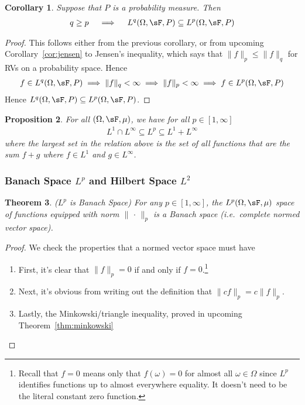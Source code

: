 \documentclass[12pt]{article}
\theoremstyle{plain}
\newtheorem{thm}{Theorem}[section]
\newtheorem{prop}[thm]{Proposition}
\newtheorem{cor}[thm]{Corollary}
\theoremstyle{definition}
\theoremstyle{remark}
\begin{document}
\begin{cor}
Suppose that $P$ is a probability measure. Then
\begin{align*}
  q \geq p
  \quad\implies\quad
  L^q(\Omega,\sF,P)
  \subseteq
  L^p(\Omega,\sF,P)
\end{align*}
\end{cor}
\begin{proof}
This follows either from the previous corollary, or from upcoming
Corollary~\ref{cor:jensen} to Jensen's inequality, which says that
$\lVert f\rVert_p\leq \lVert f\rVert_q$
for RVs on a probability space.
Hence
\begin{align*}
  f\in L^q(\Omega,\sF,P)
  \implies
  \lVert f\rVert_q
  < \infty
  \implies
  \lVert f\rVert_p
  < \infty
  \implies
  f\in L^p(\Omega,\sF,P)
\end{align*}
Hence $L^q(\Omega,\sF,P)\subseteq L^p(\Omega,\sF,P)$.
\end{proof}

\begin{prop}
For all $(\Omega,\sF,\mu)$, we have for all $p\in[1,\infty]$
\begin{align*}
  L^1 \cap L^\infty \subseteq L^p \subseteq L^1+L^\infty
\end{align*}
where the largest set in the relation above is the set of all functions
that are the sum $f+g$ where $f\in L^1$ and $g\in L^\infty$.
\end{prop}


\clearpage
\subsubsection{Banach Space $L^p$ and Hilbert Space $L^2$}

\begin{thm}\emph{($L^p$ is Banach Space)}
For any $p\in[1,\infty]$, the $L^p(\Omega,\sF,\mu)$ space of functions
equipped with norm $\lVert\,\cdot\,\rVert_p$ is a Banach space (i.e.\
complete normed vector space).
\end{thm}
\begin{proof}
We check the properties that a normed vector space must have
\begin{enumerate}
  \item First, it's clear that $\lVert f\rVert_p=0$ if and only if
    $f=0$.\footnote{%
      Recall that $f=0$ means only that $f(\omega)=0$ for almost all
      $\omega\in\Omega$ since $L^p$ identifies functions up to almost
      everywhere equality. It doesn't need to be the literal constant
      zero function.
    }
  \item Next, it's obvious from writing out the definition that $\lVert
    cf\rVert_p = c\lVert f\rVert_p$.
  \item Lastly, the Minkowski/triangle inequality,
    proved in upcoming Theorem~\ref{thm:minkowski}
\end{enumerate}
\end{proof}
\end{document}
